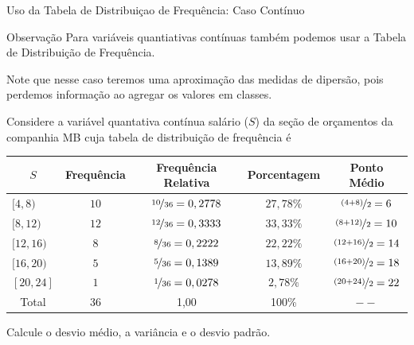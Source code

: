 \documentclass[8pt]{beamer}
\begin{document}
\begin{frame}{Uso da Tabela de Distribuiçao de Frequência: Caso Contínuo}
\begin{block}{Observação}
  Para variáveis quantiativas contínuas também podemos usar a Tabela de Distribuição de Frequência. 
  
  Note que nesse caso teremos uma {\color{red} aproximação} das medidas de dipersão, pois perdemos informação ao agregar os valores 
  em classes.
 \end{block}

  Considere a variável quantativa contínua salário ($S$) da seção de orçamentos da companhia MB cuja tabela de distribuição de frequência é 
 
 {\tiny
  \begin{table}
   \centering
   \begin{tabular}{l|ccc|c}
    \toprule[0.05cm]
    \multicolumn{1}{c|}{$S$} & Frequência & Frequência Relativa & Porcentagem & Ponto Médio \\ \midrule[0.05cm]
    $[4, 8)$ & $10$ & $\nicefrac{10}{36}=0,2778$ & $27,78 \%$ & $\nicefrac{(4+8)}{2} = 6$ \\
    $[8, 12)$ & $12$ & $\nicefrac{12}{36}=0,3333$ & $33,33 \%$ & $\nicefrac{(8+12)}{2} = 10$\\
    $[12, 16)$ & $8$ & $\nicefrac{8}{36}=0,2222$ & $22,22 \%$ &  $\nicefrac{(12+16)}{2} = 14$\\
    $[16, 20)$ & $5$ & $\nicefrac{5}{36}=0,1389$ & $13,89 \%$ & $\nicefrac{(16+20)}{2} = 18$\\
    $[20, 24]$ & $1$ & $\nicefrac{1}{36}=0,0278$ & $2,78 \%$ & $\nicefrac{(20+24)}{2} = 22$\\ \midrule[0.05cm]
    \multicolumn{1}{c|}{Total} & 36 & 1,00 & 100\% & $--$ \\ \bottomrule[0.05cm]
   \end{tabular}
  \end{table}
 }
 
 Calcule o desvio médio, a variância e o desvio padrão. 
\end{frame}
\end{document}
